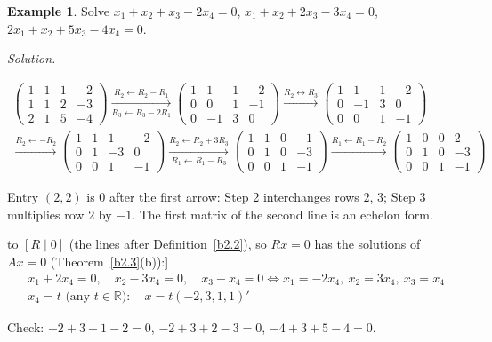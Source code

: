 \documentclass[12pt]{article}
\newcommand{\R}{\mathbb R}
\theoremstyle{definition}
\newtheorem{example}[theorem]{Example}
\newcommand{\boardtop}{\vspace*{-\abovedisplayskip}}
\begin{document}
\begin{example}\label{b2.6}
Solve \(x_1+x_2+x_3-2x_4=0\), \(x_1+x_2+2x_3-3x_4=0\), \(2x_1+x_2+5x_3-4x_4=0\).
\end{example}
\textit{Solution.}
\begin{board}[Row-reduce the coefficient matrix \(A\) (the column \(b=0\) never changes; not written):]
\[
\begin{gathered}
\begin{pmatrix}1&1&1&-2\\1&1&2&-3\\2&1&5&-4\end{pmatrix}
\xrightarrow[R_3\leftarrow R_3-2R_1]{R_2\leftarrow R_2-R_1}
\begin{pmatrix}1&1&1&-2\\0&0&1&-1\\0&-1&3&0\end{pmatrix}
\xrightarrow{R_2\leftrightarrow R_3}
\begin{pmatrix}1&1&1&-2\\0&-1&3&0\\0&0&1&-1\end{pmatrix}
\\
\xrightarrow{R_2\leftarrow-R_2}
\begin{pmatrix}1&1&1&-2\\0&1&-3&0\\0&0&1&-1\end{pmatrix}
\xrightarrow[R_1\leftarrow R_1-R_3]{R_2\leftarrow R_2+3R_3}
\begin{pmatrix}1&1&0&-1\\0&1&0&-3\\0&0&1&-1\end{pmatrix}
\xrightarrow{R_1\leftarrow R_1-R_2}
\begin{pmatrix}1&0&0&2\\0&1&0&-3\\0&0&1&-1\end{pmatrix}
\end{gathered}
\]
\end{board}
Entry \((2,2)\) is \(0\) after the first arrow: Step 2 interchanges rows \(2\), \(3\); Step 3 multiplies row \(2\) by
\(-1\). The first matrix of the second line is an echelon form.
\begin{board}[The last matrix \(R\) is in RREF, pivot columns \(1,2,3\); the operations take \([A\mid0]\) to
\([R\mid0]\) (the lines after Definition~\ref{b2.2}), so \(Rx=0\) has the solutions of \(Ax=0\) (Theorem~\ref{b2.3}(b)):]
\boardtop
\begin{align*}
&x_1+2x_4=0,\quad x_2-3x_4=0,\quad x_3-x_4=0\iff x_1=-2x_4,\ x_2=3x_4,\ x_3=x_4\\
&x_4=t\text{ (any }t\in\R):\quad x=t(-2,3,1,1)'
\end{align*}
\end{board}
Check: \(-2+3+1-2=0\), \(-2+3+2-3=0\), \(-4+3+5-4=0\).
\end{document}
